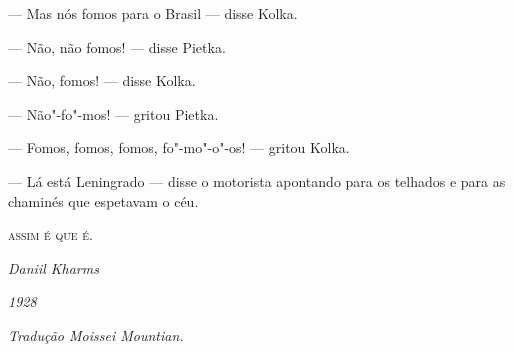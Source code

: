 --- Mas nós fomos para o Brasil --- disse Kolka.

--- Não, não fomos! --- disse Pietka.

--- Não, fomos! --- disse Kolka.

--- Não"-fo"-mos! --- gritou Pietka.

--- Fomos, fomos, fomos, fo"-mo"-o"-os! --- gritou Kolka.

--- Lá está Leningrado --- disse o motorista apontando para os telhados
e para as chaminés que espetavam o céu.

\bigskip

\begin{center}
\textsc{assim é que é.}
\end{center}

\hfill\emph{Daniil Kharms}

\hfill\emph{1928}

\medskip

{\footnotesize\hfill\emph{Tradução Moissei Mountian.}}
